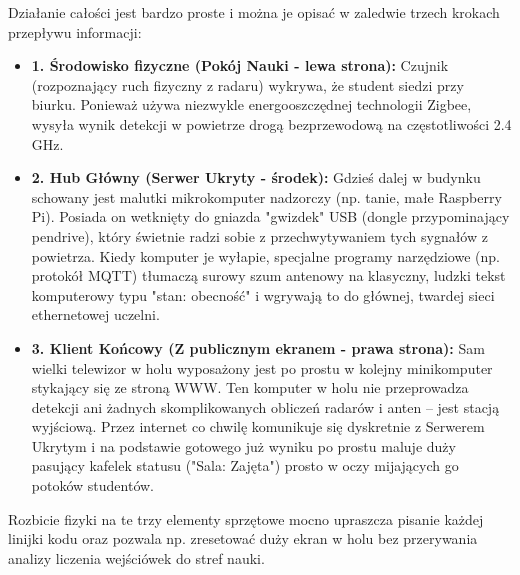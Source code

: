 \documentclass[14pt,a4paper]{extarticle}
\begin{document}
Działanie całości jest bardzo proste i można je opisać w zaledwie trzech krokach przepływu informacji:

\begin{itemize}
    \item \textbf{1. Środowisko fizyczne (Pokój Nauki - lewa strona):} Czujnik (rozpoznający ruch fizyczny z radaru) wykrywa, że student siedzi przy biurku. Ponieważ używa niezwykle energooszczędnej technologii Zigbee, wysyła wynik detekcji w powietrze drogą bezprzewodową na częstotliwości 2.4 GHz.
    \item \textbf{2. Hub Główny (Serwer Ukryty - środek):} Gdzieś dalej w budynku schowany jest malutki mikrokomputer nadzorczy (np. tanie, małe Raspberry Pi). Posiada on wetknięty do gniazda "gwizdek" USB (dongle przypominający pendrive), który świetnie radzi sobie z przechwytywaniem tych sygnałów z powietrza. Kiedy komputer je wyłapie, specjalne programy narzędziowe (np. protokół MQTT) tłumaczą surowy szum antenowy na klasyczny, ludzki tekst komputerowy typu "stan: obecność" i wgrywają to do głównej, twardej sieci ethernetowej uczelni.
    \item \textbf{3. Klient Końcowy (Z publicznym ekranem - prawa strona):} Sam wielki telewizor w holu wyposażony jest po prostu w kolejny minikomputer stykający się ze stroną WWW. Ten komputer w holu nie przeprowadza detekcji ani żadnych skomplikowanych obliczeń radarów i anten – jest stacją wyjściową. Przez internet co chwilę komunikuje się dyskretnie z Serwerem Ukrytym i na podstawie gotowego już wyniku po prostu maluje duży pasujący kafelek statusu ("Sala: Zajęta") prosto w oczy mijających go potoków studentów.
\end{itemize}

Rozbicie fizyki na te trzy elementy sprzętowe mocno upraszcza pisanie każdej linijki kodu oraz pozwala np. zresetować duży ekran w holu bez przerywania analizy liczenia wejściówek do stref nauki.
\end{document}
